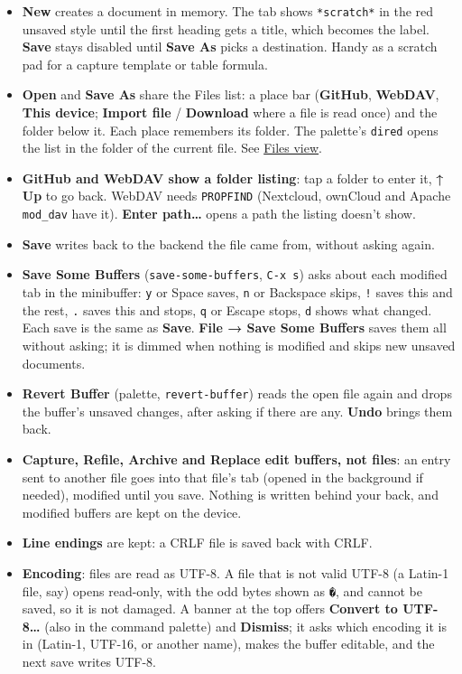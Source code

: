 \documentclass[11pt]{article}
\begin{document}
\begin{itemize}
\item \textbf{New} creates a document in memory. The tab shows \texttt{*scratch*} in the red unsaved style until the first heading gets a title, which becomes the label. \textbf{Save} stays disabled until \textbf{Save As} picks a destination. Handy as a scratch pad for a capture template or table formula.
\item \textbf{Open} and \textbf{Save As} share the Files list: a place bar (\textbf{GitHub}, \textbf{WebDAV}, \textbf{This device}; \textbf{Import file} / \textbf{Download} where a file is read once) and the folder below it. Each place remembers its folder. The palette's \texttt{dired} opens the list in the folder of the current file. See \hyperref[sec:org45e6d31]{Files view}.
\item \textbf{GitHub and WebDAV show a folder listing}: tap a folder to enter it, \textbf{↑ Up} to go back. WebDAV needs \texttt{PROPFIND} (Nextcloud, ownCloud and Apache \texttt{mod\_dav} have it). \textbf{Enter path…} opens a path the listing doesn't show.
\item \textbf{Save} writes back to the backend the file came from, without asking again.
\item \textbf{Save Some Buffers} (\texttt{save-some-buffers}, \texttt{C-x s}) asks about each modified tab in the minibuffer: \texttt{y} or Space saves, \texttt{n} or Backspace skips, \texttt{!} saves this and the rest, \texttt{.} saves this and stops, \texttt{q} or Escape stops, \texttt{d} shows what changed. Each save is the same as \textbf{Save}. \textbf{File → Save Some Buffers} saves them all without asking; it is dimmed when nothing is modified and skips new unsaved documents.
\item \textbf{Revert Buffer} (palette, \texttt{revert-buffer}) reads the open file again and drops the buffer's unsaved changes, after asking if there are any. \textbf{Undo} brings them back.
\item \textbf{Capture, Refile, Archive and Replace edit buffers, not files}: an entry sent to another file goes into that file's tab (opened in the background if needed), modified until you save. Nothing is written behind your back, and modified buffers are kept on the device.
\item \textbf{Line endings} are kept: a CRLF file is saved back with CRLF.
\item \textbf{Encoding}: files are read as UTF-8. A file that is not valid UTF-8 (a Latin-1 file, say) opens read-only, with the odd bytes shown as \texttt{�}, and cannot be saved, so it is not damaged. A banner at the top offers \textbf{Convert to UTF-8…} (also in the command palette) and \textbf{Dismiss}; it asks which encoding it is in (Latin-1, UTF-16, or another name), makes the buffer editable, and the next save writes UTF-8.

\end{itemize}
\end{document}
